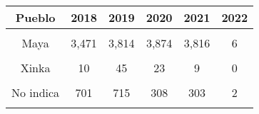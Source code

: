 \begin{tabular}[t]{cccccc}
\toprule
\textbf{Pueblo} & \textbf{2018} & \textbf{2019} & \textbf{2020} & \textbf{2021} & \textbf{2022}\\
\midrule
\cellcolor[HTML]{A8A4FB}{Ladino} & \cellcolor[HTML]{A8A4FB}{10,367} & \cellcolor[HTML]{A8A4FB}{11,480} & \cellcolor[HTML]{A8A4FB}{9,608} & \cellcolor[HTML]{A8A4FB}{12,291} & \cellcolor[HTML]{A8A4FB}{222}\\
Maya & 3,471 & 3,814 & 3,874 & 3,816 & 6\\
\cellcolor[HTML]{A8A4FB}{Garífuna} & \cellcolor[HTML]{A8A4FB}{11} & \cellcolor[HTML]{A8A4FB}{18} & \cellcolor[HTML]{A8A4FB}{32} & \cellcolor[HTML]{A8A4FB}{16} & \cellcolor[HTML]{A8A4FB}{1}\\
Xinka & 10 & 45 & 23 & 9 & 0\\
\cellcolor[HTML]{A8A4FB}{Otro} & \cellcolor[HTML]{A8A4FB}{947} & \cellcolor[HTML]{A8A4FB}{1,150} & \cellcolor[HTML]{A8A4FB}{1,299} & \cellcolor[HTML]{A8A4FB}{1,008} & \cellcolor[HTML]{A8A4FB}{55}\\
No indica & 701 & 715 & 308 & 303 & 2\\
\cellcolor[HTML]{A8A4FB}{Ignorado} & \cellcolor[HTML]{A8A4FB}{31,963} & \cellcolor[HTML]{A8A4FB}{34,982} & \cellcolor[HTML]{A8A4FB}{37,295} & \cellcolor[HTML]{A8A4FB}{37,291} & \cellcolor[HTML]{A8A4FB}{40,001}\\
\bottomrule
\end{tabular}
